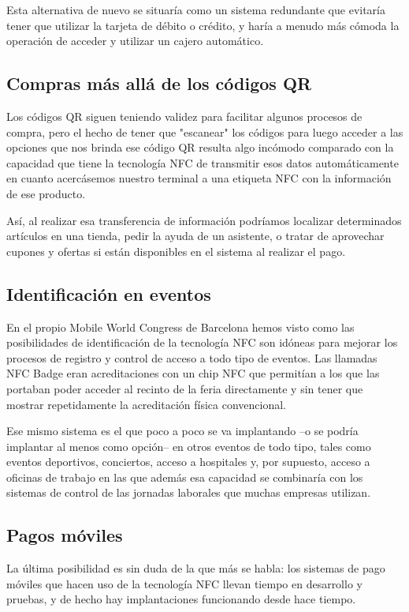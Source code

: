 Esta alternativa de nuevo se situaría como un sistema redundante que evitaría tener que utilizar la tarjeta de débito o crédito, y haría a menudo más cómoda la operación de acceder y utilizar un cajero automático.

\subsection{Compras más allá de los códigos QR}
Los códigos QR siguen teniendo validez para facilitar algunos procesos de compra, pero el hecho de tener que "escanear" los códigos para luego acceder a las opciones que nos brinda ese código QR resulta algo incómodo comparado con la capacidad que tiene la tecnología NFC de transmitir esos datos automáticamente en cuanto acercásemos nuestro terminal a una etiqueta NFC con la información de ese producto.

Así, al realizar esa transferencia de información podríamos localizar determinados artículos en una tienda, pedir la ayuda de un asistente, o tratar de aprovechar cupones y ofertas si están disponibles en el sistema al realizar el pago. 

\subsection{Identificación en eventos}
En el propio Mobile World Congress de Barcelona hemos visto como las posibilidades de identificación de la tecnología NFC son idóneas para mejorar los procesos de registro y control de acceso a todo tipo de eventos. Las llamadas NFC Badge eran acreditaciones con un chip NFC que permitían a los que las portaban poder acceder al recinto de la feria directamente y sin tener que mostrar repetidamente la acreditación física convencional.

Ese mismo sistema es el que poco a poco se va implantando --o se podría implantar al menos como opción-- en otros eventos de todo tipo, tales como eventos deportivos, conciertos, acceso a hospitales y, por supuesto, acceso a oficinas de trabajo en las que además esa capacidad se combinaría con los sistemas de control de las jornadas laborales que muchas empresas utilizan. 

\subsection{Pagos móviles}
La última posibilidad es sin duda de la que más se habla: los sistemas de pago móviles que hacen uso de la tecnología NFC llevan tiempo en desarrollo y pruebas, y de hecho hay implantaciones funcionando desde hace tiempo.

